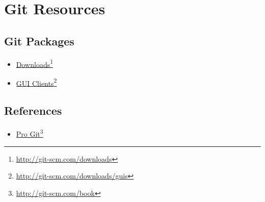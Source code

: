 
\section{Git Resources}
\label{sec:resources}

\subsection{Git Packages}
\label{gitpackages}

\begin{itemize}
\item \href{http://git-scm.com/downloads}{Downloads}\footnote{\href{http://git-scm.com/downloads}{http:/\slash git-scm.com\slash downloads}}

\item \href{http://git-scm.com/downloads/guis}{GUI Clients}\footnote{\href{http://git-scm.com/downloads/guis}{http:/\slash git-scm.com\slash downloads\slash guis}}

\end{itemize}

\subsection{References}
\label{references}

\begin{itemize}
\item \href{http://git-scm.com/book}{Pro Git}\footnote{\href{http://git-scm.com/book}{http:/\slash git-scm.com\slash book}}
\end{itemize}
